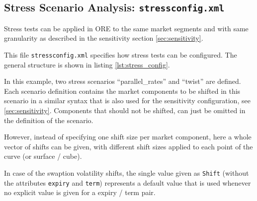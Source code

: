 \documentclass[12pt, a4paper]{article}
\begin{document}
{{%
\subsection{Stress Scenario Analysis: {\tt stressconfig.xml}}\label{sec:stress}

Stress tests can be applied in ORE to the same market segments and with same granularity as described in the sensitivity section \ref{sec:sensitivity}.

\medskip
This file {\tt stressconfig.xml} specifies how stress tests can be configured. The general structure is shown in listing
\ref{lst:stress_config}.

In this example, two stress scenarios ``parallel\_rates'' and ``twist'' are defined. Each scenario definition contains
the market components to be shifted in this scenario in a similar syntax that is also used for the sensitivity
configuration, see \ref{sec:sensitivity}. Components that should not be shifted, can just be omitted in the definition
of the scenario.

However, instead of specifying one shift size per market component, here a whole vector of shifts can be given, with
different shift sizes applied to each point of the curve (or surface / cube).

In case of the swaption volatility shifts, the single value given as {\tt Shift} (without the attributes {\tt expiry}
and {\tt term}) represents a default value that is used whenever no explicit value is given for a expiry / term pair.

}}
\end{document}
